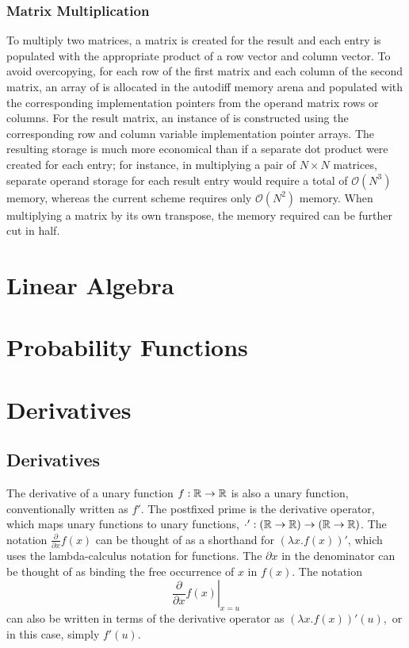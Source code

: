\documentclass[10pt]{article}
\begin{document}
\subsubsection{Matrix Multiplication}

To multiply two matrices, a matrix is created for the result and each
entry is populated with the appropriate product of a row vector and
column vector.  To avoid overcopying, for each row of the first matrix
and each column of the second matrix, an array of  is
allocated in the autodiff memory arena and populated with the
corresponding implementation pointers from the operand matrix rows or
columns.  For the result matrix, an instance of
 is constructed using the corresponding row
and column variable implementation pointer arrays.  The resulting
storage is much more economical than if a separate dot product were
created for each entry; for instance, in multiplying a pair of $N
\times N$ matrices, separate operand storage for each result entry
would require a total of $\mathcal{O}(N^3)$ memory, whereas the
current scheme requires only $\mathcal{O}(N^2)$ memory.  When
multiplying a matrix by its own transpose, the memory required can be
further cut in half.





\section{Linear Algebra}





\section{Probability Functions}






\clearpage
\appendix

\section{Derivatives}\label{derivative-definitions.section}

\subsection{Derivatives}

The derivative of a unary function $f:\mathbb{R} \rightarrow \mathbb{R}$ is
also a unary function, conventionally written as $f'$.  The postfixed prime is
the derivative operator, which maps unary functions to unary
functions, $\cdot' : \left(\mathbb{R} \rightarrow \mathbb{R}\right)
\rightarrow \left(\mathbb{R} \rightarrow \mathbb{R}\right)$.  The notation
$\frac{\partial}{\partial x} f(x)$ can be thought of as a shorthand
for $\left( \lambda x. f(x) \right)'$, which uses the lambda-calculus
notation for functions. The $\partial x$ in the denominator can be
thought of as binding the free occurrence of $x$ in $f(x)$.  The
notation
\[
\left. \frac{\partial}{\partial x} f(x) \right|_{x = u}
\]
can also be written in terms of the derivative operator as $\left(
  \lambda x. f(x) \right)'(u),$ or in this case, simply $f'(u)$.
\end{document}
